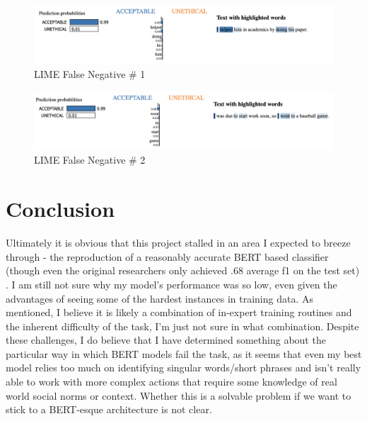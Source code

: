 \documentclass[11pt,a4paper]{article}
\begin{document}
\begin{figure}[htbp]
    \centering
    \includegraphics[width=1\linewidth]{helped.png} %
    \caption{LIME False Negative \# 1}
    \label{fig:helped}
\end{figure}

\begin{figure}[htbp]
    \centering
    \includegraphics[width=1\linewidth]{baseball.png} %
    \caption{LIME False Negative \# 2}
    \label{fig:baseball}
\end{figure}

\section{Conclusion}

Ultimately it is obvious that this project stalled in an area I expected to breeze through - the reproduction of a reasonably accurate BERT based classifier (though even the original researchers only achieved $.68$ average f1 on the test set) \cite{hendrycks2023aligning}. I am still not sure why my model's performance was so low, even given the advantages of seeing some of the hardest instances in training data. As mentioned, I believe it is likely a combination of in-expert training routines and the inherent difficulty of the task, I'm just not sure in what combination. Despite these challenges, I do believe that I have determined something about the particular way in which BERT models fail the task, as it seems that even my best model relies too much on identifying singular words/short phrases and isn't really able to work with more complex actions that require some knowledge of real world social norms or context. Whether this is a solvable problem if we want to stick to a BERT-esque architecture is not clear.
\end{document}
